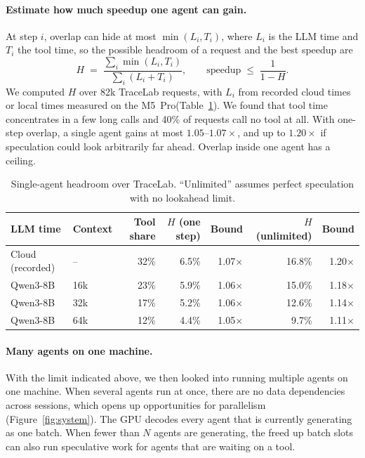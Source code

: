 \documentclass[11pt]{article}
\begin{document}
\paragraph{Estimate how much speedup one agent can gain.}
At step $i$, overlap can hide at most $\min(L_i, T_i)$, where $L_i$ is the
LLM time and $T_i$ the tool time, so the possible headroom of a request and the best speedup are
\[
  H \;=\; \frac{\sum_i \min(L_i, T_i)}{\sum_i (L_i + T_i)}, \qquad
  \text{speedup} \;\le\; \frac{1}{1 - H}.
\]
We computed $H$ over 82k TraceLab requests, with $L_i$ from recorded cloud times or local times measured on the M5~Pro(Table~\ref{tab:headroom}). 
We found that tool time concentrates in a few long calls and 40\% of requests call no tool at all.
With one-step overlap, a single agent gains at most $1.05$--$1.07\times$, and up to $1.20\times$ if speculation could look arbitrarily far ahead.
Overlap inside one agent has a ceiling.


\begin{table}[h]
\centering\small
\begin{tabular}{@{}llrrrrr@{}}
\toprule
LLM time & Context & Tool share & $H$ (one step) & Bound
  & $H$ (unlimited) & Bound \\
\midrule
Cloud (recorded) & -- & 32\% & 6.5\% & 1.07$\times$ & 16.8\% & 1.20$\times$ \\
Qwen3-8B & 16k & 23\% & 5.9\% & 1.06$\times$ & 15.0\% & 1.18$\times$ \\
Qwen3-8B & 32k & 17\% & 5.2\% & 1.06$\times$ & 12.6\% & 1.14$\times$ \\
Qwen3-8B & 64k & 12\% & 4.4\% & 1.05$\times$ &  9.7\% & 1.11$\times$ \\
\bottomrule
\end{tabular}
\caption{Single-agent headroom over TraceLab. ``Unlimited'' assumes perfect speculation with no lookahead limit.}
\label{tab:headroom}
\end{table}

\paragraph{Many agents on one machine.}
With the limit indicated above, we then looked into running multiple agents on one machine. When several agents run at once, there are no data dependencies across
sessions, which opens up opportunities for parallelism (Figure~\ref{fig:system}). 
The GPU decodes every agent that is currently generating as one batch.
When fewer than $N$ agents are generating, the freed up batch slots can also run speculative work for agents that are waiting on a tool.
\end{document}
